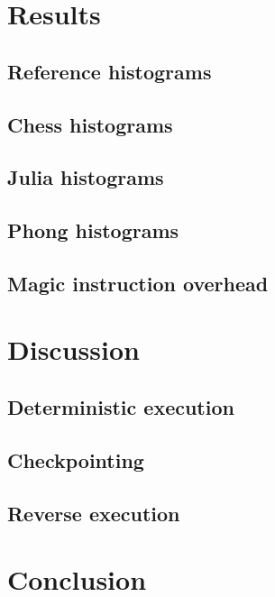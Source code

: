 \documentclass{beamer}
\begin{document}
	\section{Results}
	\subsection{Reference histograms}
	
	\subsection{Chess histograms}
	
	\subsection{Julia histograms}
	
	\subsection{Phong histograms}
	
	\subsection{Magic instruction overhead}
	

	\section{Discussion}
	\subsection{Deterministic execution}
	
	\subsection{Checkpointing}
	
	\subsection{Reverse execution}
	

	\section{Conclusion}
\end{document}
